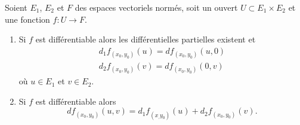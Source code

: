 \begin{proposition} \label{PropLDN_nHWDF}
    Soient \( E_1\), \( E_2\) et \( F\) des espaces vectoriels normés, soit un ouvert \( U\subset E_1\times E_2\) et une fonction \( f\colon U\to F\).
    \begin{enumerate}
        \item   \label{ItemRDD_oPmXVi}
            Si \( f\) est différentiable alors les différentielles partielles existent et
            \begin{subequations}
                \begin{align}
                    d_1f_{(x_0,y_0)}(u)=df_{(x_0,y_0)}(u,0)\\
                    d_2f_{(x_0,y_0)}(v)=df_{(x_0,y_0)}(0,v)
                \end{align}
            \end{subequations}
            où \( u\in E_1\) et \( v\in E_2\).
        \item
            Si \( f\) est différentiable alors
            \begin{equation}
                df_{(x_0,y_0)}(u,v)=d_1f_{(x_,y_0)}(u)+d_2f_{(x_0,y_0)}(v).
            \end{equation}
    \end{enumerate}
\end{proposition}

